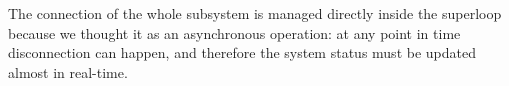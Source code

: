 \documentclass[12pt, letterpaper, twoside]{article}
\begin{document}
The connection of the whole subsystem is managed directly inside the superloop because we thought it as an asynchronous operation: at any point in time disconnection can happen, and therefore the system status must be updated almost in real-time.  

\label{sec:conc}




% 
% 
\end{document}

